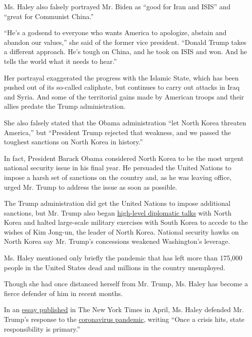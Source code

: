 Ms. Haley also falsely portrayed Mr. Biden as ``good for Iran and ISIS''
and ``great for Communist China.''

``He's a godsend to everyone who wants America to apologize, abstain and
abandon our values,'' she said of the former vice president. ``Donald
Trump takes a different approach. He's tough on China, and he took on
ISIS and won. And he tells the world what it needs to hear.''

Her portrayal exaggerated the progress with the Islamic State, which has
been pushed out of its so-called caliphate, but continues to carry out
attacks in Iraq and Syria. And some of the territorial gains made by
American troops and their allies predate the Trump administration.

She also falsely stated that the Obama administration ``let North Korea
threaten America,'' but ``President Trump rejected that weakness, and we
passed the toughest sanctions on North Korea in history.''

In fact, President Barack Obama considered North Korea to be the most
urgent national security issue in his final year. He persuaded the
United Nations to impose a harsh set of sanctions on the country and, as
he was leaving office, urged Mr. Trump to address the issue as soon as
possible.

The Trump administration did get the United Nations to impose additional
sanctions, but Mr. Trump also began
\href{https://www.nytimes3xbfgragh.onion/2018/06/12/world/asia/north-korea-summit.html}{high-level
diplomatic talks} with North Korea and halted large-scale military
exercises with South Korea to accede to the wishes of Kim Jong-un, the
leader of North Korea. National security hawks on North Korea say Mr.
Trump's concessions weakened Washington's leverage.

Ms. Haley mentioned only briefly the pandemic that has left more than
175,000 people in the United States dead and millions in the country
unemployed.

Though she had once distanced herself from Mr. Trump, Ms. Haley has
become a fierce defender of him in recent months.

In an
\href{https://www.nytimes3xbfgragh.onion/2020/04/08/opinion/nikki-haley-governor-coronavirus-trump.html}{essay
published} in The New York Times in April, Ms. Haley defended Mr.
Trump's response to the
\href{https://www.nytimes3xbfgragh.onion/news-event/coronavirus}{coronavirus
pandemic}, writing ``Once a crisis hits, state responsibility is
primary.''

